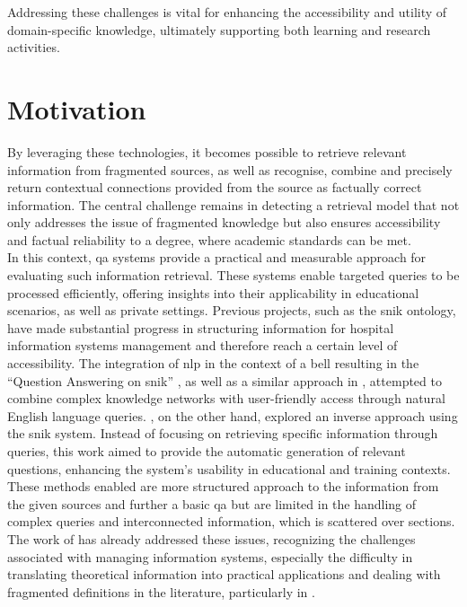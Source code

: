 Addressing these challenges is vital for enhancing the accessibility and utility of domain-specific knowledge, ultimately supporting both learning and research activities. 

\section{Motivation}\label{sec:motivation}
By leveraging these technologies, it becomes possible to retrieve relevant information from fragmented sources, as well as recognise, combine and precisely return contextual connections provided from the source as factually correct information. 
The central challenge remains in detecting a retrieval model that not only addresses the issue of fragmented knowledge but also ensures accessibility and factual reliability to a degree, where academic standards can be met.\\ 
In this context, \ac{qa} systems provide a practical and measurable approach for evaluating such information retrieval. 
These systems enable targeted queries to be processed efficiently, offering insights into their applicability in educational scenarios, as well as private settings.
% 
Previous projects, such as the \ac{snik} ontology, have made substantial progress in structuring information for hospital information systems management and therefore reach a certain level of accessibility. 
The integration of \ac{nlp} in the context of a \ac{bell} resulting in the \enquote{Question Answering on \ac{snik}} \citep{hannesbell, hannesbell_skill}, as well as a similar approach in \citet{snikquiz}, attempted to combine complex knowledge networks with user-friendly access through natural English language queries. 
\citet{arneba}, on the other hand, explored an inverse approach using the \ac{snik} system. 
Instead of focusing on retrieving specific information through queries, this work aimed to provide the automatic generation of relevant questions, enhancing the system's usability in educational and training contexts.\\
%
These methods enabled are more structured approach to the information from the given sources and further a basic \ac{qa} but are limited in the handling of complex queries and interconnected information, which is scattered over sections.
The work of \citet{Paul_Keller} has already addressed these issues, recognizing the challenges associated with managing information systems, especially the difficulty in translating theoretical information into practical applications and dealing with fragmented definitions in the literature, particularly in \citet{bb2}. 
